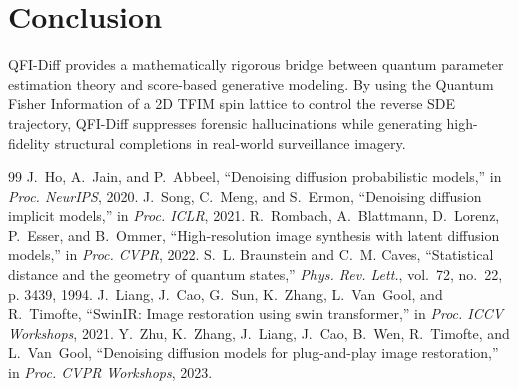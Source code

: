 \documentclass[10pt,journal,compsoc]{IEEEtran}
\begin{document}
\section{Conclusion}
QFI-Diff provides a mathematically rigorous bridge between quantum parameter estimation theory and score-based generative modeling. By using the Quantum Fisher Information of a 2D TFIM spin lattice to control the reverse SDE trajectory, QFI-Diff suppresses forensic hallucinations while generating high-fidelity structural completions in real-world surveillance imagery.


\begin{thebibliography}{99}
J.~Ho, A.~Jain, and P.~Abbeel, ``Denoising diffusion probabilistic models,'' in \emph{Proc. NeurIPS}, 2020.
J.~Song, C.~Meng, and S.~Ermon, ``Denoising diffusion implicit models,'' in \emph{Proc. ICLR}, 2021.
R.~Rombach, A.~Blattmann, D.~Lorenz, P.~Esser, and B.~Ommer, ``High-resolution image synthesis with latent diffusion models,'' in \emph{Proc. CVPR}, 2022.
S.~L. Braunstein and C.~M. Caves, ``Statistical distance and the geometry of quantum states,'' \emph{Phys. Rev. Lett.}, vol.~72, no.~22, p. 3439, 1994.
J.~Liang, J.~Cao, G.~Sun, K.~Zhang, L.~Van~Gool, and R.~Timofte, ``SwinIR: Image restoration using swin transformer,'' in \emph{Proc. ICCV Workshops}, 2021.
Y.~Zhu, K.~Zhang, J.~Liang, J.~Cao, B.~Wen, R.~Timofte, and L.~Van~Gool, ``Denoising diffusion models for plug-and-play image restoration,'' in \emph{Proc. CVPR Workshops}, 2023.
\end{thebibliography}
\end{document}
